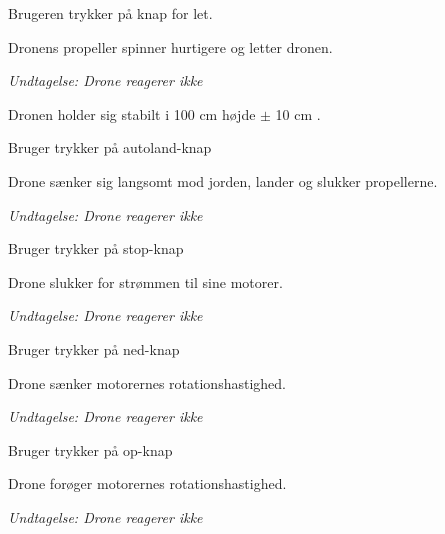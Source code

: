\documentclass[Main]{subfiles}
\begin{document}
\begin{UseCase}

	\begin{normFor}
	\item Brugeren trykker på knap for let.
	\item Dronens propeller spinner hurtigere og letter dronen.
	\item[] \textit{Undtagelse: Drone reagerer ikke}
	\item Dronen holder sig stabilt i 100 cm højde $\pm$ 10 cm .
	\end{normFor} 
	
	\begin{normFor}
	\item Bruger trykker på autoland-knap
	\item Drone sænker sig langsomt mod jorden, lander og slukker propellerne.
	\item[] \textit{Undtagelse: Drone reagerer ikke}
	\end{normFor} 
	
	\begin{normFor}
	\item Bruger trykker på stop-knap
	\item Drone slukker for strømmen til sine motorer.
	\item[] \textit{Undtagelse: Drone reagerer ikke}
	\end{normFor} 
	
	\begin{normFor}
	\item Bruger trykker på ned-knap
	\item Drone sænker motorernes rotationshastighed.
	\item[] \textit{Undtagelse: Drone reagerer ikke}
	\end{normFor} 
	
	\begin{normFor}
	\item Bruger trykker på op-knap
	\item Drone forøger motorernes rotationshastighed.
	\item[] \textit{Undtagelse: Drone reagerer ikke}
	\end{normFor} 
	

\end{UseCase}
\end{document}
